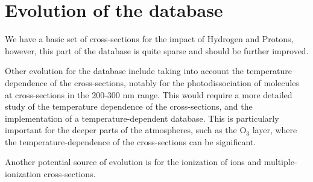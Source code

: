 
\chapter{Evolution of the database}
\label{evolution}

We have a basic set of cross-sections for the impact of Hydrogen and Protons, however, this part of the database is quite sparse and should be further improved.

Other evolution for the database include taking into account the temperature dependence of the cross-sections, notably for the photodissociation of molecules at cross-sections in the 200-300 nm range. This would require a more detailed study of the temperature dependence of the cross-sections, and the implementation of a temperature-dependent database. This is particularly important for the deeper parts of the atmospheres, such as the O$_3$ layer, where the temperature-dependence of the cross-sections can be significant.

Another potential source of evolution is for the ionization of ions and multiple-ionization cross-sections. 



